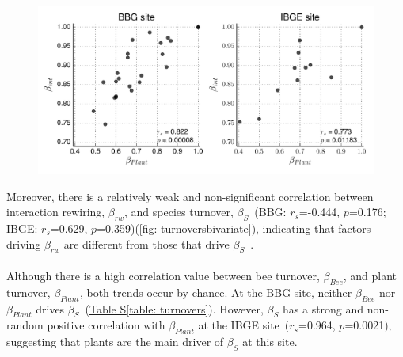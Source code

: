 \documentclass[11pt]{article}
\begin{document}
\vspace*{\fill}
\begin{figure}[H]
  \centering
    \includegraphics[width=\textwidth]{plantturnover.pdf}
       \label{fig: plantturnover}
\end{figure} 
\vspace*{\fill}
Moreover, there is a relatively weak and non-significant correlation between interaction rewiring, $\beta_{rw}$, and species turnover, $\beta_{S}$~(BBG: $r_{s}$=-0.444, $p$=0.176; IBGE: $r_{s}$=0.629, $p$=0.359)(\autoref{fig: turnoversbivariate}), indicating that factors driving $\beta_{rw}$ are different from those that drive $\beta_{S}$~\citep{Poisot2012}. \\
\\
Although there is a high correlation value between bee turnover, $\beta_{Bee}$, and plant turnover, $\beta_{Plant}$, both trends occur by chance. At the BBG site, neither $\beta_{Bee}$ nor $\beta_{Plant}$ drives $\beta_{S}$~(\hyperref[table: turnovers]{Table S\ref{table: turnovers}}). However, $\beta_{S}$ has a strong and non-random positive correlation with $\beta_{Plant}$ at the IBGE site~($r_{s}$=0.964, $p$=0.0021), suggesting that plants are the main driver of $\beta_{S}$ at this site. 
\vspace*{\fill}
\end{document}
